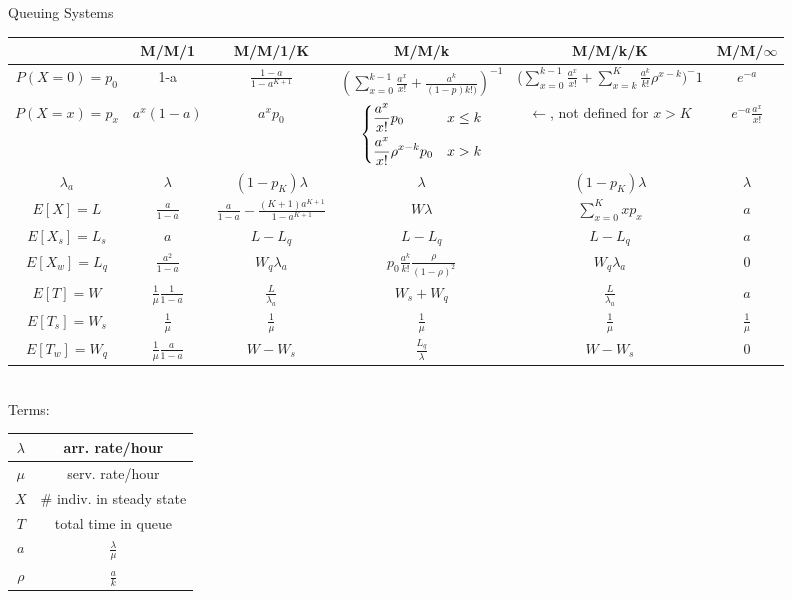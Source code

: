 \documentclass[10pt,landscape]{article}
\begin{document}
Queuing Systems \\

\begin{tabular}{|c|c|c|c|c|c|}
\hline
& M/M/1 & M/M/1/K & M/M/k & M/M/k/K & M/M/$\infty$ \\
\hline
$P(X=0) = p_0$ & 1-a & $\frac{1-a}{1-a^{K+1}} $ & $(\sum _{x=0} ^{k-1} \frac{a^x}{x!} + \frac{a^{k}}{(1-p)k!)})^{-1} $
& ($\sum _{x=0} ^{k-1} \frac{a^x}{x!} + \sum _{x=k} ^K \frac{a^k}{k!}\rho^{x-k})^-1 $ & $e^{-a}$ \\
\hline
$P(X=x)=p_x$ & $a^x(1-a)$ & $a^xp_0$ &
$\begin{dcases}
	\frac{a^x}{x!}p_0				& x \leq k \\
	\frac{a^x}{x!}\rho^{x-k}p_0 	& x > k
\end{dcases}$ &$\leftarrow$, not defined for $x > K$ & $e^{-a}\frac{a^x}{x!}$ \\
\hline
$\lambda_a$ & $\lambda$ & $(1-p_K)\lambda$ & $\lambda$ & $(1-p_K)\lambda$ & $\lambda$ \\
\hline
$E[X] = L$ & $\frac{a}{1-a}$ & $\frac{a}{1-a}- \frac{(K+1)a^{K+1}}{1-a^{K+1}} $ & $W\lambda$ & $\sum _{x=0}^K xp_x$ & $a$ \\
\hline
$E[X_s] = L_s$ & $a$ & $L-L_q$ & $L-L_q$ & $L-L_q$ & $a$ \\
\hline
$E[X_w] = L_q$ & $\frac{a^2}{1-a}$ & $W_q\lambda_a$ & $p_0 \frac{a^k}{k!} \frac{\rho}{(1-\rho)^2} $ & $W_q\lambda_a$ & 0 \\
\hline
$E[T]=W$ & $\frac{1}{\mu} \frac{1}{1-a}$ & $\frac{L}{\lambda_a}$ & $W_s + W_q$ & $\frac{L}{\lambda_a}$ & $a$ \\
\hline
$E[T_s]=W_s$ & $\frac{1}{\mu}$ & $\frac{1}{\mu}$ & $\frac{1}{\mu}$ & $\frac{1}{\mu}$ & $\frac{1}{\mu}$ \\
\hline
$E[T_w]=W_q$ & $\frac{1}{\mu} \frac{a}{1-a}$ & $W-W_s$ & $\frac{L_q}{\lambda}$ & $W-W_s$ & 0 \\
\hline
\end{tabular}
\\
Terms: \\
\begin{tabular}{|c|c|}
\hline
$\lambda$ &arr. rate/hour \\
\hline
$\mu$ & serv. rate/hour \\
\hline
$X$ & \# indiv. in steady state \\
\hline
$T$ & total time in queue \\
\hline
$a$ & $\frac{\lambda}{\mu}$ \\
\hline
$\rho$ & $\frac{a}{k}$ \\
\hline
\end{tabular}
\end{document}
